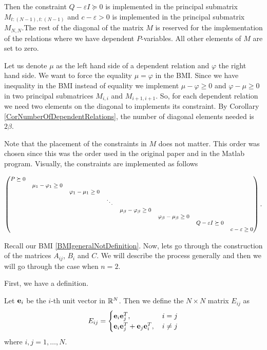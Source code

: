 \documentclass[a4paper,12pt,twoside,BCOR=10mm]{scrbook}
\begin{document}
Then the constraint $Q - \varepsilon I\succeq 0$ is implemented in the principal submatrix $M_{t:(N-1), t:(N-1)}$ and $c - \varepsilon > 0$ is implemented in the principal submatrix $M_{N,N}$.The rest of the diagonal of the matrix $M$ is reserved for the implementation of the relations where we have dependent $P$-variables. All other elements of $M$ are set to zero.

Let us denote $\mu$ as the left hand side of a dependent relation and $\varphi$ the right hand side. We want to force the equality $\mu = \varphi$ in the BMI. Since we have inequality in the BMI instead of equality we implement $\mu - \varphi \geq 0$ and $\varphi - \mu \geq 0$ in two principal submatrices $M_{i,i}$ and $M_{i+1,i+1}$. So, for each dependent relation we need two elements on the diagonal to implements its constraint. By Corollary \ref{CorNumberOfDependentRelations}, the number of diagonal elements needed is $2\beta$.

Note that the placement of the constraints in $M$ does not matter. This order was chosen since this was the order used in the original paper \citep{Ha2019BMI} and in the Matlab program. Visually, the constraints are implemented as follows

\begin{align*}
\footnotesize{
    \begin{pmatrix}
    P \succeq 0 & & & & & & &\\
      & \mu_1 - \varphi_1 \geq 0 & & & & & &\\
      & & \varphi_1 - \mu_1 \geq 0 & & & & &\\
      & & & \ddots & & & &\\
      & & & & \mu_\beta - \varphi_\beta \geq 0 & & &\\
      & & & & & \varphi_\beta - \mu_\beta \geq 0 & &\\
      & & & & & & Q - \varepsilon I \succeq 0 &\\
      & & & & & & & c - \varepsilon \geq 0
    \end{pmatrix}.
    }
\end{align*}

Recall our BMI \eqref{BMIgeneralNotDefinition}. Now, lets go through the construction of the matrices $A_{ij}$, $B_i$ and $C$. We will describe the process generally and then we will go through the case when $n = 2$.

First, we have a definition.
\begin{definition}
Let $\mathbf{e}_i$ be the $i$-th unit vector in $\mathbb{R}^{N}$. Then we define the $N\times N$ matrix $E_{ij}$ as
\begin{align*}
    E_{ij} = \begin{cases}
    \mathbf{e}_i \mathbf{e}_j^T, &\, i = j\\
    \mathbf{e}_i \mathbf{e}_j^T + \mathbf{e}_j \mathbf{e}_i^T, &\, i \neq j 
    \end{cases}
\end{align*}
where $i,j = 1, \ldots, N$.
\end{definition}
\end{document}
